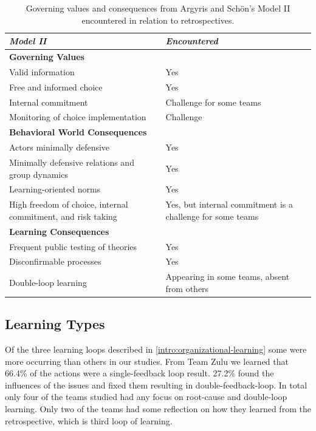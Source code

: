 \begin{table}[h]
	\begin{center}
		\caption{Governing values and consequences from Argyris and Schön's Model II encountered in relation to retrospectives.}
		\label{table:model-ii-occurences}
		\begin{tabular}{p{} p{}}
			\hline
			\textit{Model II} & \textit{Encountered} \\
			\hline
			\textbf{Governing Values} & \\
			Valid information & Yes \\
			Free and informed choice & Yes \\
			Internal commitment & Challenge for some teams \\
			Monitoring of choice implementation & Challenge \\
			\hline
			\textbf{Behavioral World Consequences} & \\
			Actors minimally defensive & Yes \\
			Minimally defensive relations and group dynamics & Yes \\
			Learning-oriented norms & Yes \\
			High freedom of choice, internal commitment, and risk taking & Yes, but internal commitment is a challenge for some teams \\
			\hline
			\textbf{Learning Consequences} & \\
			Frequent public testing of theories & Yes \\
			Disconfirmable processes & Yes \\
			Double-loop learning & Appearing in some teams, absent from others \\
			\hline
		\end{tabular}
	\end{center}
\end{table}

\subsection{Learning Types}
\label{discussion:learning-types}
Of the three learning loops described in \autoref{intro:organizational-learning} some were more occurring than others in our studies. From Team Zulu we learned that 66.4\% of the actions were a single-feedback loop result. 27.2\% found the influences of the issues and fixed them resulting in double-feedback-loop. In total only four of the teams studied had any focus on root-cause and double-loop learning. Only two of the teams had some reflection on how they learned from the retrospective, which is third loop of learning.

